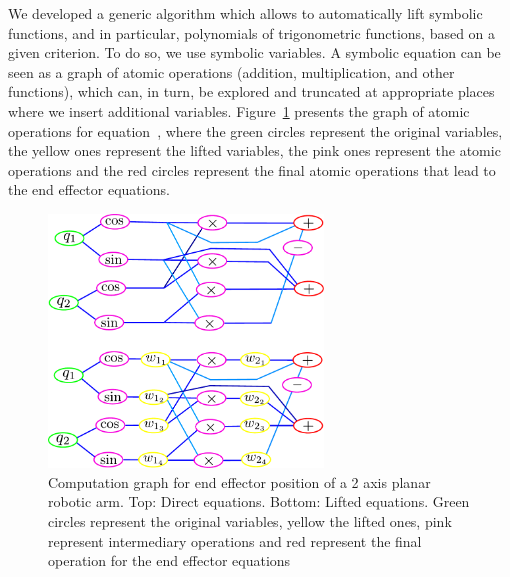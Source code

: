 We developed a generic algorithm which allows to automatically lift symbolic functions, and in particular, polynomials of trigonometric functions, based on a given criterion.
To do so, we use symbolic variables.
A symbolic equation can be seen as a graph of atomic operations (addition, multiplication, and other functions), which can, in turn, be explored and truncated at appropriate places where we insert additional variables.
Figure~\ref{fig:graph_direct} presents the graph of atomic operations for equation~, where the green circles represent the original variables, the yellow ones represent the lifted variables, the pink ones represent the atomic operations and the red circles represent the final atomic operations that lead to the end effector equations.
\begin{figure}
  \centering
  \includegraphics[width=0.65\textwidth]{graphDirectLiftedEEPos.pdf}
  \caption{Computation graph for end effector position of a 2 axis planar robotic arm. Top: Direct equations. Bottom: Lifted equations. Green circles represent the original variables, yellow the lifted ones, pink represent intermediary operations and red represent the final operation for the end effector equations}
\label{fig:graph_direct}
\end{figure}

